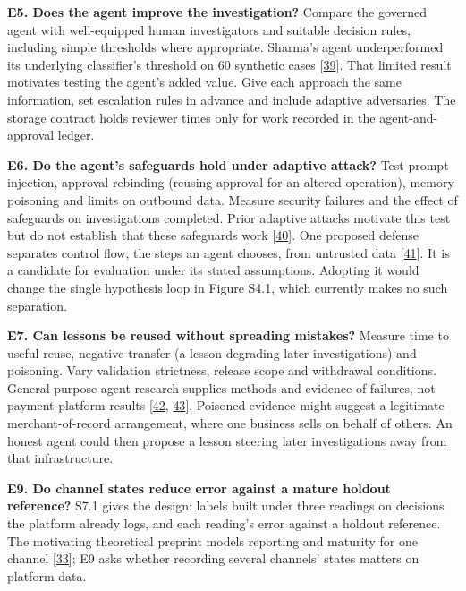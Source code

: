 \documentclass[
  11pt,
]{article}
\begin{document}
\textbf{E5. Does the agent improve the investigation?} Compare the
governed agent with well-equipped human investigators and suitable
decision rules, including simple thresholds where appropriate. Sharma's
agent underperformed its underlying classifier's threshold on 60
synthetic cases
{[}\protect\hyperlink{ref-Sharma2026AuditableFraud}{39}{]}. That limited
result motivates testing the agent's added value. Give each approach the
same information, set escalation rules in advance and include adaptive
adversaries. The storage contract holds reviewer times only for work
recorded in the agent-and-approval ledger.

\textbf{E6. Do the agent's safeguards hold under adaptive attack?} Test
prompt injection, approval rebinding (reusing approval for an altered
operation), memory poisoning and limits on outbound data. Measure
security failures and the effect of safeguards on investigations
completed. Prior adaptive attacks motivate this test but do not
establish that these safeguards work
{[}\protect\hyperlink{ref-Nasr2025}{40}{]}. One proposed defense
separates control flow, the steps an agent chooses, from untrusted data
{[}\protect\hyperlink{ref-Debenedetti2025CaMeL}{41}{]}. It is a
candidate for evaluation under its stated assumptions. Adopting it would
change the single hypothesis loop in Figure S4.1, which currently makes
no such separation.

\textbf{E7. Can lessons be reused without spreading mistakes?} Measure
time to useful reuse, negative transfer (a lesson degrading later
investigations) and poisoning. Vary validation strictness, release scope
and withdrawal conditions. General-purpose agent research supplies
methods and evidence of failures, not payment-platform results
{[}\protect\hyperlink{ref-Dash2026}{42},
\protect\hyperlink{ref-Xiong2026MemoryManagement}{43}{]}. Poisoned
evidence might suggest a legitimate merchant-of-record arrangement,
where one business sells on behalf of others. An honest agent could then
propose a lesson steering later investigations away from that
infrastructure.

\textbf{E9. Do channel states reduce error against a mature holdout
reference?} S7.1 gives the design: labels built under three readings on
decisions the platform already logs, and each reading's error against a
holdout reference. The motivating theoretical preprint models reporting
and maturity for one channel
{[}\protect\hyperlink{ref-Dhama2026Causal}{33}{]}; E9 asks whether
recording several channels' states matters on platform data.
\end{document}
